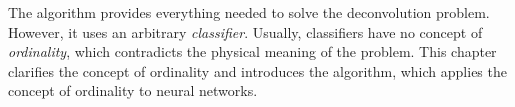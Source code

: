 The \dsea{} algorithm provides everything needed to solve the deconvolution problem.
However,
it uses an arbitrary \emph{classifier}.
Usually,
  classifiers have no concept of \emph{ordinality},
which contradicts the physical meaning of the problem.
%
This chapter
  clarifies the concept of ordinality
  and
  introduces the \corn{} algorithm,
    which applies the concept of ordinality to neural networks.
